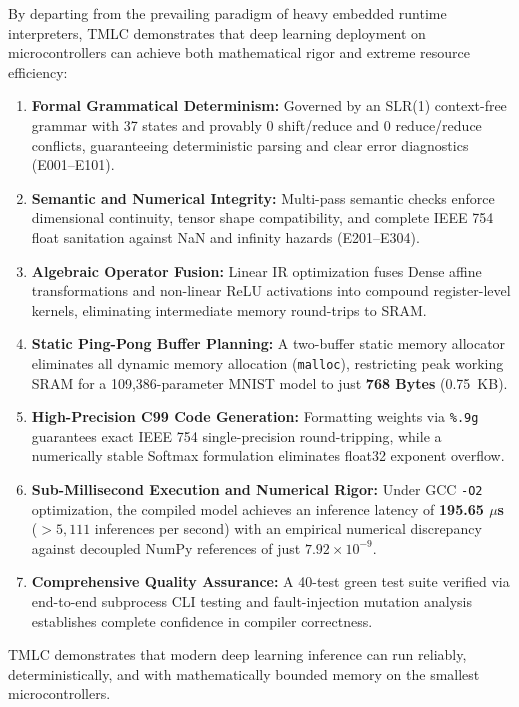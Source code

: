 \documentclass[11pt,a4paper]{article}
\begin{document}
By departing from the prevailing paradigm of heavy embedded runtime interpreters, TMLC demonstrates that deep learning deployment on microcontrollers can achieve both mathematical rigor and extreme resource efficiency:
\begin{enumerate}
    \item \textbf{Formal Grammatical Determinism:} Governed by an SLR(1) context-free grammar with 37 states and provably 0 shift/reduce and 0 reduce/reduce conflicts, guaranteeing deterministic parsing and clear error diagnostics (E001--E101).
    \item \textbf{Semantic and Numerical Integrity:} Multi-pass semantic checks enforce dimensional continuity, tensor shape compatibility, and complete IEEE 754 float sanitation against NaN and infinity hazards (E201--E304).
    \item \textbf{Algebraic Operator Fusion:} Linear IR optimization fuses Dense affine transformations and non-linear ReLU activations into compound register-level kernels, eliminating intermediate memory round-trips to SRAM.
    \item \textbf{Static Ping-Pong Buffer Planning:} A two-buffer static memory allocator eliminates all dynamic memory allocation (\texttt{malloc}), restricting peak working SRAM for a 109,386-parameter MNIST model to just \textbf{768 Bytes} (0.75~KB).
    \item \textbf{High-Precision C99 Code Generation:} Formatting weights via \texttt{\%.9g} guarantees exact IEEE 754 single-precision round-tripping, while a numerically stable Softmax formulation eliminates float32 exponent overflow.
    \item \textbf{Sub-Millisecond Execution and Numerical Rigor:} Under GCC \texttt{-O2} optimization, the compiled model achieves an inference latency of \textbf{195.65 $\mu$s} ($>5,111$ inferences per second) with an empirical numerical discrepancy against decoupled NumPy references of just $7.92 \times 10^{-9}$.
    \item \textbf{Comprehensive Quality Assurance:} A 40-test green test suite verified via end-to-end subprocess CLI testing and fault-injection mutation analysis establishes complete confidence in compiler correctness.
\end{enumerate}

TMLC demonstrates that modern deep learning inference can run reliably, deterministically, and with mathematically bounded memory on the smallest microcontrollers.
\end{document}
